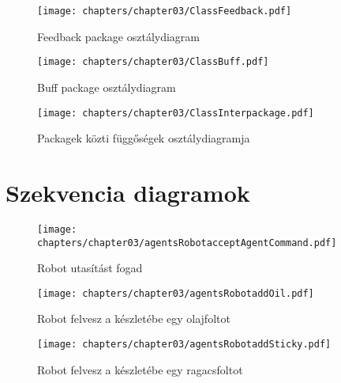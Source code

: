 \begin{itemize}
\begin{figure}[h]
\begin{center}
\texttt{[image: chapters/chapter03/ClassFeedback.pdf]}
\caption{Feedback package osztálydiagram}
\label{Feedback package osztálydiagram}
\end{center}
\end{figure}


\begin{figure}[h]
\begin{center}
\texttt{[image: chapters/chapter03/ClassBuff.pdf]}
\caption{Buff package osztálydiagram}
\label{Buff package osztálydiagram}
\end{center}
\end{figure}


\begin{figure}[h]
\begin{center}
\texttt{[image: chapters/chapter03/ClassInterpackage.pdf]}
\caption{Packagek közti függőségek osztálydiagramja}
\label{Packagek közti függőségek osztálydiagramja}
\end{center}
\end{figure}

\clearpage

\section{Szekvencia diagramok}

\begin{figure}[h]
	\begin{center}
		\texttt{[image: chapters/chapter03/agentsRobotacceptAgentCommand.pdf]}
		\caption{Robot utasítást fogad}
		\label{fig:agents.Robot.accept}
	\end{center}
\end{figure}

\begin{figure}[h]
	\begin{center}
		\texttt{[image: chapters/chapter03/agentsRobotaddOil.pdf]}
		\caption{Robot felvesz a készletébe egy olajfoltot}
		\label{fig:agents.Robot.addOil}
	\end{center}
\end{figure}

\begin{figure}[h]
	\begin{center}
		\texttt{[image: chapters/chapter03/agentsRobotaddSticky.pdf]}
		\caption{Robot felvesz a készletébe egy ragacsfoltot}
		\label{fig:agents.Robot.addSticky}
	\end{center}
\end{figure}


\end{itemize}
